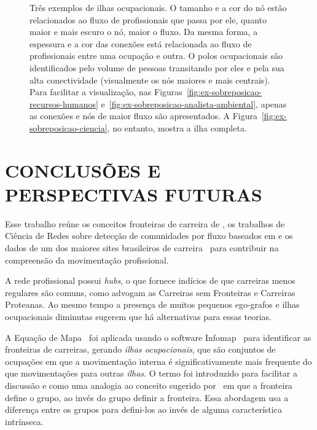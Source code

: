 \documentclass[12pt,a4paper]{article}
\begin{document}
\begin{figure}[ht]
{        \label{fig:ex-sobreposicao-analista-ambiental}
    }
    \caption{Três exemplos de ilhas ocupacionais. O tamanho e a cor do nó estão relacionados ao fluxo de profissionais que passa por ele, quanto maior e mais escuro o nó, maior o fluxo. Da mesma forma, a espessura e a cor das conexões está relacionada ao fluxo de profissionais entre uma ocupação e outra. O polos ocupacionais são identificados pelo volume de pessoas transitando por eles e pela sua alta conectividade (visualmente os nós maiores e mais centrais). Para facilitar a visualização, nas Figuras~\ref{fig:ex-sobreposicao-recursos-humanos} e~\ref{fig:ex-sobreposicao-analista-ambiental}, apenas as conexões e nós de maior fluxo são apresentados. A Figura~\ref{fig:ex-sobreposicao-ciencia}, no entanto, mostra a ilha completa.}
    \label{fig:ex-ilhas-ocupacionais}
\end{figure}

\section{CONCLUSÕES E PERSPECTIVAS FUTURAS} \label{sec:conclusoes}

Esse trabalho reúne os conceitos fronteiras de carreira de , os trabalhos de Ciência de Redes sobre detecção de comunidades por fluxo baseados em \cite{Rosvall2009-sd} e os dados de um dos maiores sites brasileiros de carreira~\cite{VAGAS_Tecnologia2014-yv} para contribuir na compreensão da movimentação profissional.

A rede profissional possui \textit{hubs}, o que fornece indícios de que carreiras menos regulares são comuns, como advogam as Carreiras sem Fronteiras e Carreiras Proteanas. Ao mesmo tempo a presença de muitos pequenos ego-grafos e ilhas ocupacionais diminutas sugerem que há alternativas para essas teorias.

A Equação de Mapa~\cite{Rosvall2009-sd} foi aplicada usando o software Infomap~\cite{Edler2012-hh} para identificar as fronteiras de carreiras, gerando \textit{ilhas ocupacionais}, que são conjuntos de ocupações em que a movimentação interna é significativamente mais frequente do que movimentações para outras \textit{ilhas}. O termo foi introduzido para facilitar a discussão e como uma analogia ao conceito sugerido por~\cite{Abbott1995-ft} em que a fronteira define o grupo, ao invés do grupo definir a fronteira. Essa abordagem usa a diferença entre os grupos para defini-los ao invés de alguma característica intrínseca. 
\end{document}
